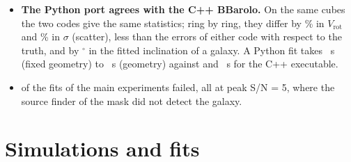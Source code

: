 \documentclass[10pt,a4paper]{article}
\newcommand{\vrot}{V_\mathrm{rot}}
\begin{document}
\begin{itemize}
  explain the S/N-dependent biases. \emph{At low S/N}, the mask (MASK = SEARCH) cuts the faint line
  wings and disk edges, and the model is penalised there: $\sigma$ is underestimated and INC
  overestimated (by up to $+5^\circ$). \emph{At high S/N}, the azimuthal normalisation (NORM = AZIM,
  the default) of the model of a single ring, which lacks the beam-smeared emission of the
  neighbouring rings, makes the fit prefer a lower inclination ($\DiagDefault^\circ$ at S/N 200 for
  INC = 45--75$^\circ$) and a larger $\sigma$. With NORM = LOCAL, or with the rest of the disk added to
  the model of the ring, the high-S/N bias disappears ($\DiagLocal^\circ$ and $\ScanRest^\circ$).
  With the defaults the two effects cancel near peak S/N 20.
\item \textbf{The Python port agrees with the C++ BBarolo.} On the same cubes the two codes give the
  same statistics; ring by ring, they differ by \CppVSig\% in $\vrot$ and \CppSSig\% in $\sigma$
  (scatter), less than the errors of either code with respect to the truth, and by
  \CppGeoDiff$^\circ$ in the fitted inclination of a galaxy. A Python fit takes
  \TimePyRes{}~s (fixed geometry) to \TimePyGeo{}~s (geometry) against \TimeCppRes{} and
  \TimeCppGeo{}~s for the C++ executable.
\item \NFailed{} of the \NFits{} fits of the main experiments failed, all at peak S/N = 5, where the
  source finder of the mask did not detect the galaxy.
\end{itemize}

\tableofcontents

\section{Simulations and fits}\label{sec:setup}
\end{document}
